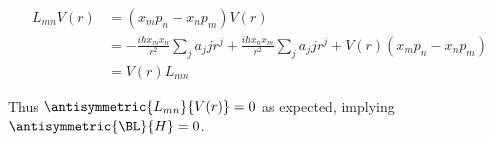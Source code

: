 \begin{align*}
L_{mn} V(r) 
&=
(x_m p_n - x_n p_m) V(r) \\
&= 
-\frac{i \hbar x_m x_n}{r^2} \sum_j a_j j r^j
+\frac{i \hbar x_n x_m}{r^2} \sum_j a_j j r^j 
+ 
V(r) (x_m p_n - x_n p_m )
\\
&= 
V(r) L_{mn}
\end{align*}

Thus $\antisymmetric{L_{mn}}{V(r)} = 0$ as expected, implying $\antisymmetric{\BL}{H} = 0$.

\EndArticle

